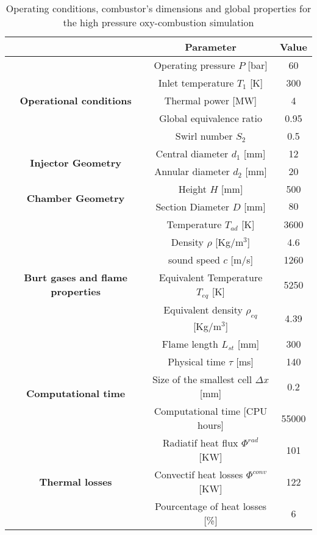 \documentclass[twocolumn,10pt]{asme2e}
\begin{document}
\begin{table}[t!]
\centering
\caption{Operating conditions, combustor's dimensions and global properties for the high pressure oxy-combustion simulation }
\begin{adjustbox}{width=0.9\columnwidth,center}
\begin{tabular}{|c|c|c|}
  \hline
  & \textbf{Parameter} & \textbf{Value} \\
  \hline
  \multirow{5}{25 mm}{ \textbf{Operational conditions}} & Operating pressure $P$ [bar] & 60 \\ & Inlet temperature $T_1$ [K] & 300 \\ & Thermal power [MW] & 4 \\ & Global equivalence ratio & 0.95 \\ & Swirl number $S_2$  & 0.5 \\ %
  \hline
  \multirow{2}{25 mm}{ \textbf{Injector Geometry}} & Central diameter $d_1$ [mm] & 12 \\ & Annular diameter $d_2$ [mm] & 20 \\ 
  \hline
  \multirow{2}{25 mm}{ \textbf{Chamber Geometry}} & Height $H$ [mm] & 500 \\ & Section Diameter $D$ [mm] & $80$ \\ %
  \hline
  \multirow{6}{25 mm}{\textbf{Burt gases and flame properties}} & Temperature $T_{ad}$ [K] & 3600 \\ & Density $\rho$ [Kg/m$^3$] & 4.6 \\ & sound speed $c$ [m/s] & 1260 \\ & Equivalent Temperature $T_{eq}$ [K] & 5250 \\ & Equivalent density $\rho_{eq}$[Kg/m$^3$] & 4.39 \\ & Flame length $L_{st}$ [mm] & 300 \\ %
    \hline
  \multirow{3}{25 mm}{\textbf{Computational time}} & Physical time $\tau$ [ms] & 140 \\ & Size of the smallest cell $\Delta x$ [mm] & 0.2 \\ & Computational time [CPU hours] & 55000 \\ %
    \hline
  \multirow{3}{25 mm}{\textbf{Thermal losses}} & Radiatif heat flux $\Phi^{rad}$ [KW] & 101 \\ & Convectif heat losses $\Phi^{conv}$ [KW] & 122 \\ & Pourcentage of heat losses [\%] & 6 \\ %
    \hline
\end{tabular}
\end{adjustbox}
  \label{tab:BC-HOT}
\end{table}    
\end{document}
